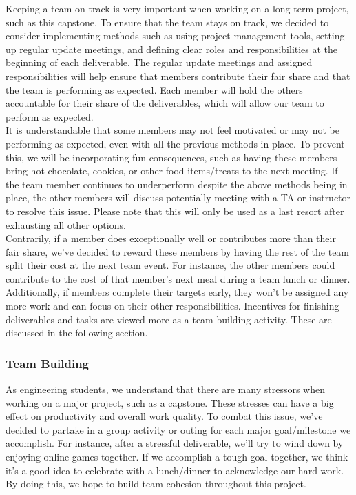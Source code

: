 \documentclass{article}
\begin{document}
Keeping a team on track is very important when working on a long-term project, such as this capstone. To ensure that the team stays on track, we decided to consider implementing methods such as using project management tools, setting up regular update meetings, and defining clear roles and responsibilities at the beginning of each deliverable. The regular update meetings and assigned responsibilities will help ensure that members contribute their fair share and that the team is performing as expected. Each member will hold the others accountable for their share of the deliverables, which will allow our team to perform as expected. \\

It is understandable that some members may not feel motivated or may not be performing as expected, even with all the previous methods in place. To prevent this, we will be incorporating fun consequences, such as having these members bring hot chocolate, cookies, or other food items/treats to the next meeting. If the team member continues to underperform despite the above methods being in place, the other members will discuss potentially meeting with a TA or instructor to resolve this issue. Please note that this will only be used as a last resort after exhausting all other options. \\

Contrarily, if a member does exceptionally well or contributes more than their fair share, we’ve decided to reward these members by having the rest of the team split their cost at the next team event. For instance, the other members could contribute to the cost of that member’s next meal during a team lunch or dinner. \\

Additionally, if members complete their targets early, they won’t be assigned any more work and can focus on their other responsibilities. Incentives for finishing deliverables and tasks are viewed more as a team-building activity. These are discussed in the following section. \\


\subsubsection*{Team Building}


As engineering students, we understand that there are many stressors when working on a major project, such as a capstone. These stresses can have a big effect on productivity and overall work quality. To combat this issue, we’ve decided to partake in a group activity or outing for each major goal/milestone we accomplish. For instance, after a stressful deliverable, we’ll try to wind down by enjoying online games together. If we accomplish a tough goal together, we think it’s a good idea to celebrate with a lunch/dinner to acknowledge our hard work. By doing this, we hope to build team cohesion throughout this project.
\end{document}
